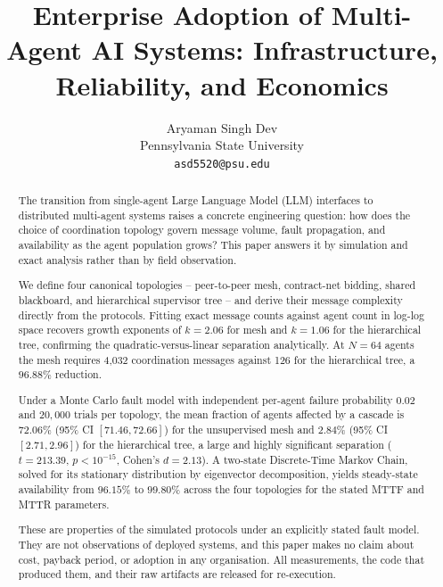 \documentclass[10pt,journal,compsoc,twocolumn]{IEEEtran}
\begin{document}
\title{Enterprise Adoption of Multi-Agent AI Systems: Infrastructure, Reliability, and Economics}

\author{
Aryaman Singh Dev\\
Pennsylvania State University \\
\texttt{asd5520@psu.edu}
}

\maketitle

\begin{abstract}
The transition from single-agent Large Language Model (LLM) interfaces to distributed multi-agent systems raises a concrete engineering question: how does the choice of coordination topology govern message volume, fault propagation, and availability as the agent population grows? This paper answers it by simulation and exact analysis rather than by field observation.

We define four canonical topologies -- peer-to-peer mesh, contract-net bidding, shared blackboard, and hierarchical supervisor tree -- and derive their message complexity directly from the protocols. Fitting exact message counts against agent count in log-log space recovers growth exponents of $k = 2.06$ for mesh and $k = 1.06$ for the hierarchical tree, confirming the quadratic-versus-linear separation analytically. At $N = 64$ agents the mesh requires 4{,}032 coordination messages against 126 for the hierarchical tree, a $96.88\%$ reduction.

Under a Monte Carlo fault model with independent per-agent failure probability $0.02$ and $20{,}000$ trials per topology, the mean fraction of agents affected by a cascade is $72.06\%$ (95\% CI $[71.46, 72.66]$) for the unsupervised mesh and $2.84\%$ (95\% CI $[2.71, 2.96]$) for the hierarchical tree, a large and highly significant separation ($t = 213.39$, $p < 10^{-15}$, Cohen's $d = 2.13$). A two-state Discrete-Time Markov Chain, solved for its stationary distribution by eigenvector decomposition, yields steady-state availability from $96.15\%$ to $99.80\%$ across the four topologies for the stated MTTF and MTTR parameters.

These are properties of the simulated protocols under an explicitly stated fault model. They are not observations of deployed systems, and this paper makes no claim about cost, payback period, or adoption in any organisation. All measurements, the code that produced them, and their raw artifacts are released for re-execution.
\end{abstract}
\end{document}
